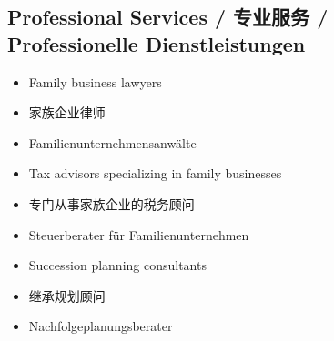 \subsection{Professional Services / 专业服务 / Professionelle Dienstleistungen}
\begin{itemize}
    \item Family business lawyers
    \item 家族企业律师
    \item Familienunternehmensanwälte
    \item Tax advisors specializing in family businesses
    \item 专门从事家族企业的税务顾问
    \item Steuerberater für Familienunternehmen
    \item Succession planning consultants
    \item 继承规划顾问
    \item Nachfolgeplanungsberater
\end{itemize}
